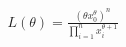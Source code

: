 \documentclass[preview]{standalone}
\begin{document}
\begin{align*}
L(\theta) = \frac{(\theta x_0^\theta)^n}{\prod_{i=1}^n x_i^{\theta+1}}
\end{align*}
\end{document}
